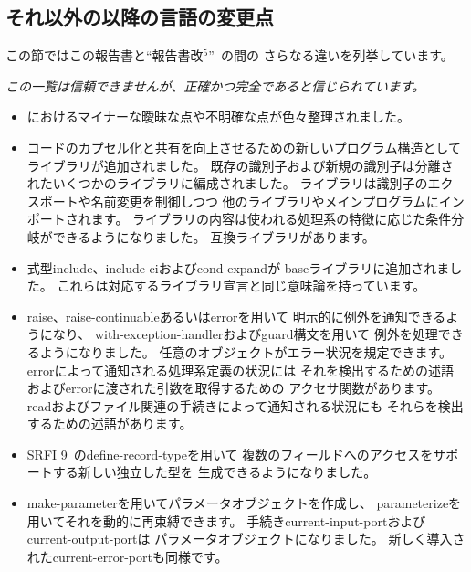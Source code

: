 \subsection*{それ以外の\rfivers{}以降の言語の変更点}
\label{differences}
この節ではこの報告書と``報告書改$^5$''~\cite{R5RS}の間の
さらなる違いを列挙しています。

{\em この一覧は信頼できませんが、正確かつ完全であると信じられています。}

\begin{itemize}

\item \rfivers{}におけるマイナーな曖昧な点や不明確な点が色々整理されました。

\item コードのカプセル化と共有を向上させるための新しいプログラム構造として
ライブラリが追加されました。
既存の識別子および新規の識別子は分離されたいくつかのライブラリに編成されました。
ライブラリは識別子のエクスポートや名前変更を制御しつつ
他のライブラリやメインプログラムにインポートされます。
ライブラリの内容は使われる処理系の特徴に応じた条件分岐ができるようになりました。
\rfivers 互換ライブラリがあります。

\item 式型{\cf include}、{\cf include-ci}および{\cf cond-expand}が
baseライブラリに追加されました。
これらは対応するライブラリ宣言と同じ意味論を持っています。

\item {\cf raise}、{\cf raise-continuable}あるいは{\cf error}を用いて
明示的に例外を通知できるようになり、
{\cf with-exception-handler}および{\cf guard}構文を用いて
例外を処理できるようになりました。
任意のオブジェクトがエラー状況を規定できます。
{\cf error}によって通知される処理系定義の状況には
それを検出するための述語および{\cf error}に渡された引数を取得するための
アクセサ関数があります。
{\cf read}およびファイル関連の手続きによって通知される状況にも
それらを検出するための述語があります。

\item SRFI 9~\cite{srfi9}の{\cf define-record-type}を用いて
複数のフィールドへのアクセスをサポートする新しい独立した型を
生成できるようになりました。

\item {\cf make-parameter}を用いてパラメータオブジェクトを作成し、
{\cf parameterize}を用いてそれを動的に再束縛できます。
手続き{\cf current-input-port}および{\cf current-output-port}は
パラメータオブジェクトになりました。
新しく導入された{\cf current-error-port}も同様です。


\end{itemize}
